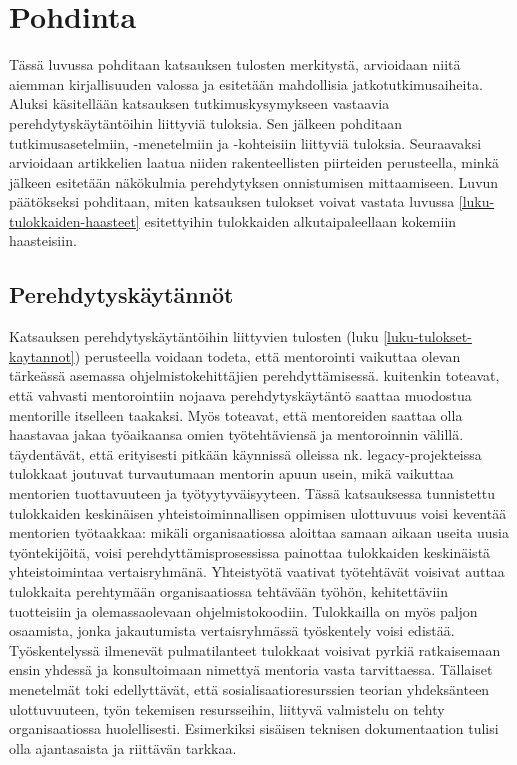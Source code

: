 \documentclass[utf8]{gradu3}
\begin{document}
\chapter{Pohdinta}
\label{paaluku-pohdinta}

Tässä luvussa pohditaan katsauksen tulosten merkitystä, arvioidaan niitä aiemman kirjallisuuden valossa ja esitetään mahdollisia jatkotutkimusaiheita. Aluksi käsitellään katsauksen tutkimuskysymykseen vastaavia perehdytyskäytäntöihin liittyviä tuloksia. Sen jälkeen pohditaan tutkimusasetelmiin, -menetelmiin ja -kohteisiin liittyviä tuloksia. Seuraavaksi arvioidaan artikkelien laatua niiden rakenteellisten piirteiden perusteella, minkä jälkeen esitetään näkökulmia perehdytyksen onnistumisen mittaamiseen. Luvun päätökseksi pohditaan, miten katsauksen tulokset voivat vastata luvussa \ref{luku-tulokkaiden-haasteet} esitettyihin tulokkaiden alkutaipaleellaan kokemiin haasteisiin.

\section{Perehdytyskäytännöt}

Katsauksen perehdytyskäytäntöihin liittyvien tulosten (luku \ref{luku-tulokset-kaytannot}) perusteella voidaan todeta, että mentorointi vaikuttaa olevan tärkeässä asemassa ohjelmistokehittäjien perehdyttämisessä. \textcite{viviani-murphy-2019} kuitenkin toteavat, että vahvasti mentorointiin nojaava perehdytyskäytäntö saattaa muodostua mentorille itselleen taakaksi. Myös \textcite{moe-ym-2020} toteavat, että mentoreiden saattaa olla haastavaa jakaa työaikaansa omien työtehtäviensä ja mentoroinnin välillä. \textcite{britto-ym-2017} täydentävät, että erityisesti pitkään käynnissä olleissa nk. legacy-projekteissa tulokkaat joutuvat turvautumaan mentorin apuun usein, mikä vaikuttaa mentorien tuottavuuteen ja työtyytyväisyyteen. Tässä katsauksessa tunnistettu tulokkaiden keskinäisen yhteistoiminnallisen oppimisen ulottuvuus voisi keventää mentorien työtaakkaa: mikäli organisaatiossa aloittaa samaan aikaan useita uusia työntekijöitä, voisi perehdyttämisprosessissa painottaa tulokkaiden keskinäistä yhteistoimintaa vertaisryhmänä. Yhteistyötä vaativat työtehtävät voisivat auttaa tulokkaita perehtymään organisaatiossa tehtävään työhön, kehitettäviin tuotteisiin ja olemassaolevaan ohjelmistokoodiin. Tulokkailla on myös paljon osaamista, jonka jakautumista vertaisryhmässä työskentely voisi edistää. Työskentelyssä ilmenevät pulmatilanteet tulokkaat voisivat pyrkiä ratkaisemaan ensin yhdessä ja konsultoimaan nimettyä mentoria vasta tarvittaessa. Tällaiset menetelmät toki edellyttävät, että sosialisaatioresurssien teorian yhdeksänteen ulottuvuuteen, työn tekemisen resursseihin, liittyvä valmistelu on tehty organisaatiossa huolellisesti. Esimerkiksi sisäisen teknisen dokumentaation tulisi olla ajantasaista ja riittävän tarkkaa.
\end{document}
